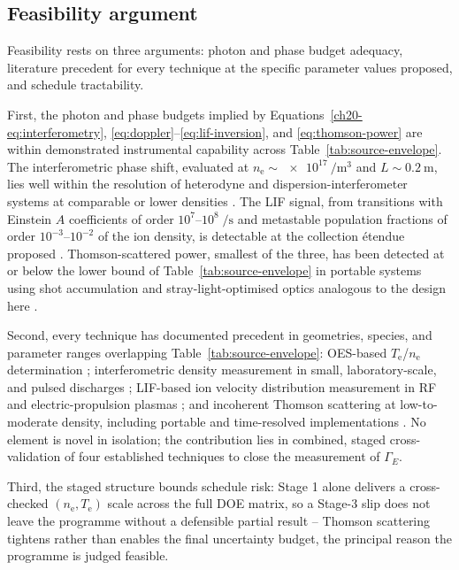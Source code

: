 \subsection{Feasibility argument}

Feasibility rests on three arguments: photon and phase budget adequacy, literature precedent for every technique at the specific parameter values proposed, and schedule tractability.

First, the photon and phase budgets implied by Equations~\eqref{ch20-eq:interferometry}, \eqref{eq:doppler}--\eqref{eq:lif-inversion}, and \eqref{eq:thomson-power} are within demonstrated instrumental capability across Table~\ref{tab:source-envelope}. The interferometric phase shift, evaluated at $n_{\mathrm{e}} \sim \SI{e17}{\per\cubic\meter}$ and $L \sim \SI{0.2}{\meter}$, lies well within the resolution of heterodyne and dispersion-interferometer systems at comparable or lower densities \cite{ref0400}. The LIF signal, from transitions with Einstein $A$ coefficients of order $10^{7}$--$10^{8}\;\si{\per\second}$ and metastable population fractions of order $10^{-3}$--$10^{-2}$ of the ion density, is detectable at the collection \'etendue proposed \cite{ref0300}. Thomson-scattered power, smallest of the three, has been detected at or below the lower bound of Table~\ref{tab:source-envelope} in portable systems using shot accumulation and stray-light-optimised optics analogous to the design here \cite{ref0357,ref0362}.

Second, every technique has documented precedent in geometries, species, and parameter ranges overlapping Table~\ref{tab:source-envelope}: OES-based $T_{\mathrm{e}}$/$n_{\mathrm{e}}$ determination \cite{ref0231,ref0237,ref0245,ref0256}; interferometric density measurement in small, laboratory-scale, and pulsed discharges \cite{ref0400}; LIF-based ion velocity distribution measurement in RF and electric-propulsion plasmas \cite{ref0292,ref0300,ref0304}; and incoherent Thomson scattering at low-to-moderate density, including portable and time-resolved implementations \cite{ref0357,ref0383,ref0384}. No element is novel in isolation; the contribution lies in combined, staged cross-validation of four established techniques to close the measurement of $\Gamma_{E}$.

Third, the staged structure bounds schedule risk: Stage 1 alone delivers a cross-checked $(n_{\mathrm{e}}, T_{\mathrm{e}})$ scale across the full DOE matrix, so a Stage-3 slip does not leave the programme without a defensible partial result -- Thomson scattering tightens rather than enables the final uncertainty budget, the principal reason the programme is judged feasible.


